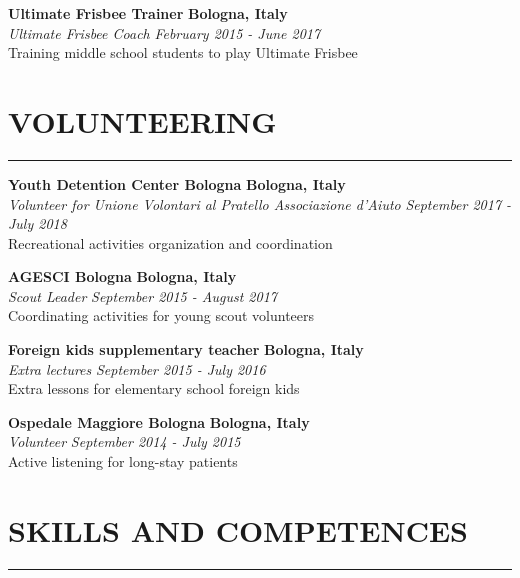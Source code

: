 \documentclass[10pt]{article}
\begin{document}
	\textbf{Ultimate Frisbee Trainer}
	\hfill
	\textbf{Bologna, Italy} \\
	\textit{Ultimate Frisbee Coach}
	\hfill
	\textit{February 2015 - June 2017} \\
	Training middle school students to play Ultimate Frisbee \\
	
	\section*{VOLUNTEERING}
	{\color{darkBlue}\rule{\linewidth}{0.5pt}}
	
	\textbf{Youth Detention Center Bologna}
	\hfill
	\textbf{Bologna, Italy} \\
	\textit{Volunteer for Unione Volontari al Pratello Associazione d'Aiuto}
	\hfill
	\textit{September 2017 - July 2018} \\
	Recreational activities organization and coordination 
	
	\textbf{AGESCI Bologna}
	\hfill
	\textbf{Bologna, Italy} \\
	\textit{Scout Leader}
	\hfill
	\textit{September 2015 - August 2017} \\
	Coordinating activities for young scout volunteers 
	
	\textbf{Foreign kids supplementary teacher}
	\hfill
	\textbf{Bologna, Italy} \\
	\textit{Extra lectures}
	\hfill
	\textit{September 2015 - July 2016} \\
	Extra lessons for elementary school foreign kids 
	
	\textbf{Ospedale Maggiore Bologna}
	\hfill
	\textbf{Bologna, Italy} \\
	\textit{Volunteer}
	\hfill
	\textit{September 2014 - July 2015} \\
	Active listening for long-stay patients \\
	
	\section*{SKILLS AND COMPETENCES}
	{\color{darkBlue}\rule{\linewidth}{0.5pt}}
	
\end{document}
